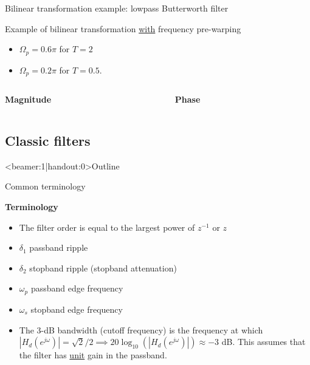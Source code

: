 \documentclass[10pt]{beamer}
\begin{document}
%
\begin{frame}{Bilinear transformation example: lowpass Butterworth filter}

Example of bilinear transformation \underline{with} frequency pre-warping
\begin{itemize}
	\item  $\Omega_p = 0.6\pi$ for $T =2$ 
	\item $\Omega_p = 0.2\pi$ for $T =0.5$.
\end{itemize} 
\vspace{0.25cm}
\begin{columns}
	\begin{column}{0.5\textwidth}
		\textbf{Magnitude}
		\begin{center}
			\resizebox{\linewidth}{!}{}
		\end{center}
	\end{column}
	\begin{column}{0.5\textwidth}
		\textbf{Phase}
		\begin{center}
			\resizebox{\linewidth}{!}{}
		\end{center}
	\end{column}
\end{columns}

\end{frame}

\subsection{Classic filters}
\begin{frame}<beamer:1|handout:0>{Outline}
	\tableofcontents[currentsubsection]
\end{frame}

\begin{frame}{Common terminology}

\begin{center}
	\resizebox{0.55\linewidth}{!}{}
\end{center}

\textbf{Terminology}
\begin{itemize}
	\item The filter order is equal to the largest power of $z^{-1}$ or $z$
	\item $\delta_1$ passband ripple
	\item $\delta_2$ stopband ripple (stopband attenuation)
	\item $\omega_p$ passband edge frequency
	\item $\omega_s$ stopband edge frequency
	\item The 3-dB bandwidth (cutoff frequency) is the frequency at which $|H_d(e^{j\omega})| = \sqrt{2}/2 \implies 20\log_{10}(|H_d(e^{j\omega})|) \approx -3$ dB. This assumes that the filter has \underline{unit} gain in the passband.
\end{itemize}
\end{frame}
\end{document}
